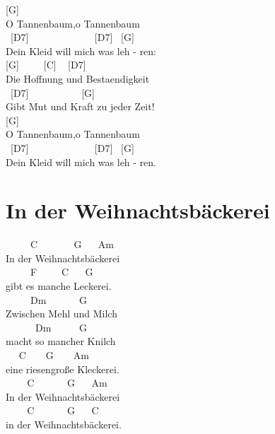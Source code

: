 \documentclass[
  letterpaper,
  twoside=false]{scrbook}
\begin{document}
{[}G{]} ~ ~\\
O Tannenbaum,o Tannenbaum\\
\hspace*{0.333em} ~{[}D7{]} ~ ~ ~ ~ ~ ~ ~ ~{[}D7{]} ~{[}G{]} ~ ~\\
Dein Kleid will mich was leh - ren:\\
\hspace*{0.333em} {[}G{]} ~ ~ ~{[}C{]} ~ {[}D7{]} ~\\
Die Hoffnung und Bestaendigkeit\\
\hspace*{0.333em} ~{[}D7{]} ~ ~ ~ ~ ~ ~ {[}G{]} ~\\
Gibt Mut und Kraft zu jeder Zeit!\\
{[}G{]} ~\\
O Tannenbaum,o Tannenbaum\\
\hspace*{0.333em} ~{[}D7{]} ~ ~ ~ ~ ~ ~ ~ ~{[}D7{]} ~{[}G{]} ~ ~\\
Dein Kleid will mich was leh - ren.

\hypertarget{in-der-weihnachtsbuxe4ckerei}{%
\chapter{In der Weihnachtsbäckerei}\label{in-der-weihnachtsbuxe4ckerei}}

~ ~ ~ C ~ ~ ~ ~ G ~ ~Am\\
In der Weihnachtsbäckerei\\
\hspace*{0.333em} ~ ~ ~ F ~ ~ ~C ~ ~G\\
gibt es manche Leckerei. ~ ~\\
\hspace*{0.333em} ~ ~ ~ Dm ~ ~ ~ ~G\\
Zwischen Mehl und Milch ~\\
\hspace*{0.333em} ~ ~ ~ ~Dm ~ ~ ~ G\\
macht so mancher Knilch ~ ~\\
\hspace*{0.333em} ~ ~C ~ ~ G ~ ~ Am\\
eine riesengroße Kleckerei.\\
\hspace*{0.333em} ~ ~ ~C ~ ~ ~ ~G ~ ~Am\\
In der Weihnachtsbäckerei ~\\
\hspace*{0.333em} ~ ~ ~C ~ ~ ~ ~G ~ ~C\\
in der Weihnachtsbäckerei.
\end{document}
